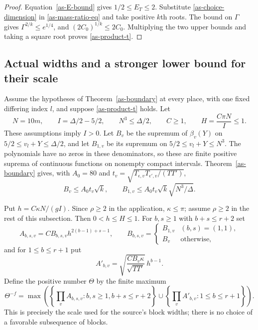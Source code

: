 \begin{proof}
Equation~\eqref{as-E-bound} gives $1/2\leq E_T\leq2$.
Substitute \eqref{as-choice-dimension} in
\eqref{as-mass-ratio-eq} and take positive $k$th roots.
The bound on $\Gamma$ gives $\Gamma^{2/k}\leq e^{1/4}$,
and $(2C_0)^{1/k}\leq2C_0$.  Multiplying the two upper
bounds and taking a square root proves
\eqref{as-product-t}.
\end{proof}

\subsection{Actual widths and a stronger lower bound for their scale}

Assume the hypotheses of Theorem~\ref{as-boundary} at every
place, with one fixed differing index $l$, and suppose
\eqref{as-product-t} holds.  Let
\[
 N=10m,\qquad I=\Delta/2-5/2,
 \qquad N^3\leq\Delta/2,
 \qquad C\geq1,\qquad
 H=\frac{C\pi N}{I}\leq1.
\]
These assumptions imply $I>0$.
Let $B_v$ be the supremum of $\beta_v(Y)$ on
$5/2\leq v_l+Y\leq\Delta/2$, and let $B_{1,v}$ be its
supremum on $5/2\leq v_l+Y\leq N^3$.
The polynomials have no zeros in these denominators, so these
are finite positive suprema of continuous functions on nonempty
compact intervals.  Theorem~\ref{as-boundary} gives, with
$A_0=80$ and $t_v=\sqrt{T_{\epsilon,v}T_{\epsilon',v}/(TT')}$,
\begin{equation}\label{as-B-bounds}
 B_v\leq A_0t_v\sqrt k,
 \qquad B_{1,v}\leq A_0t_v\sqrt k\sqrt{N^3/\Delta}.
\end{equation}

Put $h=C\kappa N/(gI)$.  Since $\rho\geq2$ in the
application, $\kappa\leq\pi$; assume $\rho\geq2$ in the
rest of this subsection.  Then $0<h\leq H\leq1$.
For $b,s\geq1$ with $b+s\leq r+2$ set
\[
 A_{b,s,v}=C B_{b,s,v}h^{2(b-1)+s-1},
 \qquad
 B_{b,s,v}=
 \begin{cases}B_{1,v}&(b,s)=(1,1),\\B_v&\text{otherwise},\end{cases}
\]
and for $1\leq b\leq r+1$ put
\[
 A'_{b,v}=\sqrt{\frac{C B_v\kappa}{\sqrt{TT'}}}\,h^{b-1}.
\]
Define the positive number $\Theta$ by the finite maximum
\begin{equation}\label{as-scale-definition}
 \Theta^{-f}=
 \max\left(\left\{\prod_vA_{b,s,v}:b,s\geq1,
                                           b+s\leq r+2\right\}
       \cup\left\{\prod_vA'_{b,v}:1\leq b\leq r+1\right\}\right).
\end{equation}
This is precisely the scale used for the source's block widths;
there is no choice of a favorable subsequence of blocks.

